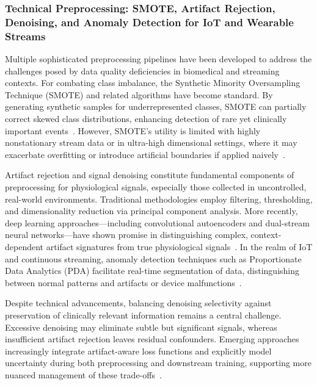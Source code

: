 \documentclass[sigconf]{acmart}
\begin{document}
\subsubsection{Technical Preprocessing: SMOTE, Artifact Rejection, Denoising, and Anomaly Detection for IoT and Wearable Streams}

Multiple sophisticated preprocessing pipelines have been developed to address the challenges posed by data quality deficiencies in biomedical and streaming contexts. For combating class imbalance, the Synthetic Minority Oversampling Technique (SMOTE) and related algorithms have become standard. By generating synthetic samples for underrepresented classes, SMOTE can partially correct skewed class distributions, enhancing detection of rare yet clinically important events~\cite{ref89,ref102}. However, SMOTE’s utility is limited with highly nonstationary stream data or in ultra-high dimensional settings, where it may exacerbate overfitting or introduce artificial boundaries if applied naively~\cite{ref106}.

Artifact rejection and signal denoising constitute fundamental components of preprocessing for physiological signals, especially those collected in uncontrolled, real-world environments. Traditional methodologies employ filtering, thresholding, and dimensionality reduction via principal component analysis. More recently, deep learning approaches—including convolutional autoencoders and dual-stream neural networks—have shown promise in distinguishing complex, context-dependent artifact signatures from true physiological signals~\cite{ref96,ref97}. In the realm of IoT and continuous streaming, anomaly detection techniques such as Proportionate Data Analytics (PDA) facilitate real-time segmentation of data, distinguishing between normal patterns and artifacts or device malfunctions~\cite{ref90}.

Despite technical advancements, balancing denoising selectivity against preservation of clinically relevant information remains a central challenge. Excessive denoising may eliminate subtle but significant signals, whereas insufficient artifact rejection leaves residual confounders. Emerging approaches increasingly integrate artifact-aware loss functions and explicitly model uncertainty during both preprocessing and downstream training, supporting more nuanced management of these trade-offs~\cite{ref106}.
\end{document}
